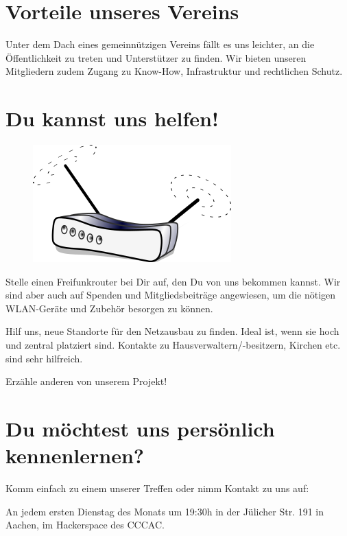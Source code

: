 \documentclass[10pt]{scrartcl}
\begin{document}
\newpage
{}

\section{\normalsize Vorteile unseres Vereins}
Unter dem Dach eines gemeinnützigen Vereins fällt es uns leichter, an die Öffentlichkeit zu treten und Unterstützer zu finden. Wir bieten unseren Mitgliedern zudem Zugang zu Know-How, Infrastruktur und rechtlichen Schutz.

\section{\normalsize Du kannst uns helfen!}
\begin{figure}
\includegraphics[scale=0.4]{Router}
\end{figure}
Stelle einen Freifunkrouter bei Dir auf, den Du von uns bekommen kannst. Wir sind aber auch auf Spenden und Mitgliedsbeiträge angewiesen, um die nötigen WLAN-Geräte und Zubehör besorgen zu können.

Hilf uns, neue Standorte für den Netzausbau zu finden. Ideal ist, wenn sie hoch und zentral platziert sind. Kontakte zu Hausverwaltern/-besitzern, Kirchen etc. sind sehr hilfreich.

Erzähle anderen von unserem Projekt!

\section{\normalsize Du möchtest uns persönlich kennenlernen?}
Komm einfach zu einem unserer Treffen oder nimm Kontakt zu uns auf:
\begin{framed}
\noindent An jedem ersten Dienstag des Monats um 19:30h in der Jülicher Str. 191 in Aachen, im Hackerspace des CCCAC.
\end{framed}
\end{document}
